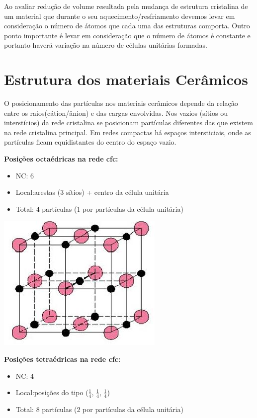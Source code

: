 Ao avaliar redução de volume resultada pela mudança de estrutura cristalina de um material que durante o seu aquecimento/resfriamento devemos levar em consideração o número de átomos que cada uma das estruturas comporta. Outro ponto importante é levar em consideração que o número de átomos é constante e portanto haverá variação na número de células unitárias formadas.


 \section{Estrutura dos materiais Cerâmicos}

O posicionamento das partículas nos materiais cerâmicos depende da relação entre os raios(cátion/ânion) e das cargas envolvidas. Nos vazios (sítios ou interstícios) da rede cristalina se posicionam partículas diferentes das que existem na rede cristalina principal. Em redes compactas há espaços intersticiais, onde as partículas ficam equidistantes do centro do espaço vazio.


\textbf{Posições octaédricas na rede cfc:}

\begin{itemize}
	
	\setlength{\parskip}{0pt}
	\setlength{\itemsep}{0pt plus 1pt}
	
	\item NC: 6
	\item Local:arestas (3 sítios) + centro da célula unitária
	\item Total: 4 partículas (1 por partículas da célula unitária)
\end{itemize}

\includegraphics[scale=0.5,trim={0 0 0 0}]{figures/occfc}


\textbf{ Posições tetraédricas na rede cfc:}

\begin{itemize}
	
	\setlength{\parskip}{0pt}
	\setlength{\itemsep}{0pt plus 1pt}
	
	\item NC: 4
	\item Local:posições do tipo ($\frac{1}{4}$, $\frac{1}{4}$, $\frac{1}{4}$)
	\item Total: 8 partículas (2 por partículas	da célula unitária)
\end{itemize}

